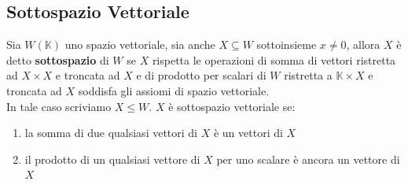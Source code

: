 \documentclass{article}
\begin{document}
\subsection{Sottospazio Vettoriale}
Sia $W(\mathbb{K})$ uno spazio vettoriale, sia anche $X\subseteq W$
sottoinsieme $x \ne 0$, allora $X$ è detto \textbf{sottospazio} di $W$ se $X$
rispetta le operazioni di somma di vettori ristretta ad $X\times X$ e troncata
ad $X$ e di prodotto per scalari di $W$ ristretta a $\mathbb{K}\times X$ e
troncata ad $X$ soddisfa gli assiomi di spazio vettoriale. \\ In tale caso
scriviamo $X \leqslant W$. $X$ è sottospazio vettoriale se:
\begin{enumerate}
    \item la somma di due qualsiasi vettori di $X$ è un vettori di $X$
    \item il prodotto di un qualsiasi vettore di $X$ per uno scalare è ancora un vettore
          di $X$
\end{enumerate}
\end{document}
